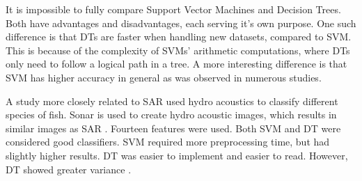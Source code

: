 \hspace{0.5cm} It is impossible to fully compare Support Vector Machines and Decision Trees. Both have advantages and disadvantages, each serving it's own purpose. One such difference is that DTs are faster when handling new datasets, compared to SVM. This is because of the complexity of SVMs' arithmetic computations, where DTs only need to follow a logical path in a tree. A more interesting difference is that SVM has higher accuracy in general as was observed in numerous studies\cite{arun2010hybrid}.
 
A study more closely related to SAR used hydro acoustics to classify different species of fish. Sonar is used to create hydro acoustic images, which results in similar images as SAR \cite{HolmReplaceThis}. Fourteen features were used. Both SVM and DT were considered good classifiers. SVM required more preprocessing time, but had slightly higher results. DT was easier to implement and easier to read. However, DT showed greater variance \cite{Robothametal2011}.



